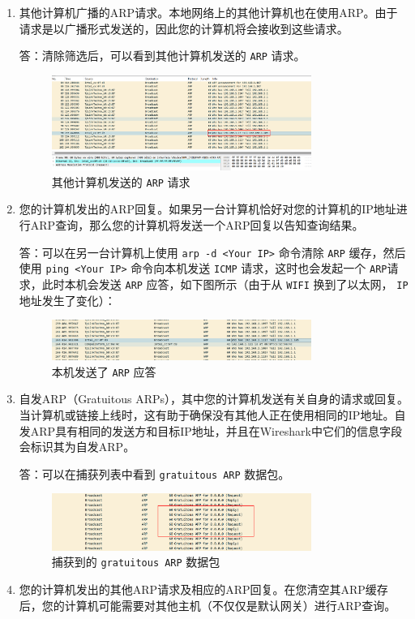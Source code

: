 \documentclass{article}
\begin{document}
\begin{enumerate}[noitemsep]
\item 其他计算机广播的ARP请求。本地网络上的其他计算机也在使用ARP。由于请求是以广播形式发送的，因此您的计算机将会接收到这些请求。

答：清除筛选后，可以看到其他计算机发送的 \texttt{ARP} 请求。

\begin{figure}[H]
  \centering
  \includegraphics[width=0.8\textwidth]{img/10.png}
  \caption{其他计算机发送的 \texttt{ARP} 请求}
  \label{fig:10}
\end{figure}

\item 您的计算机发出的ARP回复。如果另一台计算机恰好对您的计算机的IP地址进行ARP查询，那么您的计算机将发送一个ARP回复以告知查询结果。

答：可以在另一台计算机上使用 \texttt{arp -d <Your IP>} 命令清除 \texttt{ARP} 缓存，然后使用 \texttt{ping <Your IP>} 命令向本机发送 \texttt{ICMP} 请求，这时也会发起一个 \texttt{ARP}请求，此时本机会发送 \texttt{ARP} 应答，如下图所示（由于从 \texttt{WIFI} 换到了以太网， \texttt{IP} 地址发生了变化）：

\begin{figure}[H]
  \centering
  \includegraphics[width=0.8\textwidth]{img/11.png}
  \caption{本机发送了 \texttt{ARP} 应答}
  \label{fig:11}
\end{figure}

\item 自发ARP（Gratuitous ARPs），其中您的计算机发送有关自身的请求或回复。当计算机或链接上线时，这有助于确保没有其他人正在使用相同的IP地址。自发ARP具有相同的发送方和目标IP地址，并且在Wireshark中它们的信息字段会标识其为自发ARP。

答：可以在捕获列表中看到 \texttt{gratuitous ARP} 数据包。

\begin{figure}[H]
\centering
\includegraphics[width=0.8\textwidth]{img/13.png}
\caption{捕获到的 \texttt{gratuitous ARP} 数据包}
\label{fig:13}
\end{figure}
\item 您的计算机发出的其他ARP请求及相应的ARP回复。在您清空其ARP缓存后，您的计算机可能需要对其他主机（不仅仅是默认网关）进行ARP查询。


\end{enumerate}
\end{document}
